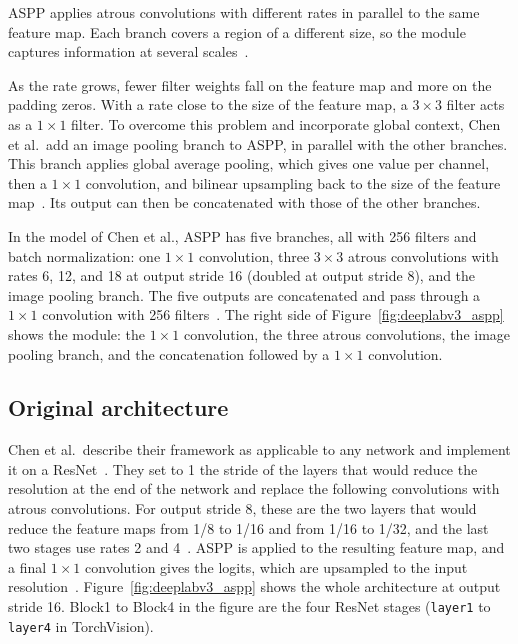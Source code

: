 ASPP applies atrous convolutions with different rates in parallel to the same feature map. Each branch covers a region of a different size, so the module captures information at several scales~\cite{chen2017deeplab}.

As the rate grows, fewer filter weights fall on the feature map and more on the padding zeros. With a rate close to the size of the feature map, a $3\times3$ filter acts as a $1\times1$ filter. To overcome this problem and incorporate global context, Chen et al.\ add an image pooling branch to ASPP, in parallel with the other branches. This branch applies global average pooling, which gives one value per channel, then a $1\times1$ convolution, and bilinear upsampling back to the size of the feature map~\cite{chen2017deeplab,geron2026handson}. Its output can then be concatenated with those of the other branches.

In the model of Chen et al., ASPP has five branches, all with 256 filters and batch normalization: one $1\times1$ convolution, three $3\times3$ atrous convolutions with rates 6, 12, and 18 at output stride 16 (doubled at output stride 8), and the image pooling branch. The five outputs are concatenated and pass through a $1\times1$ convolution with 256 filters~\cite{chen2017deeplab}. The right side of Figure~\ref{fig:deeplabv3_aspp} shows the module: the $1\times1$ convolution, the three atrous convolutions, the image pooling branch, and the concatenation followed by a $1\times1$ convolution.
\newpage
\subsection{Original architecture}
\label{subsec:deeplabv3_original}

Chen et al.\ describe their framework as applicable to any network and implement it on a ResNet~\cite{chen2017deeplab}. They set to 1 the stride of the layers that would reduce the resolution at the end of the network and replace the following convolutions with atrous convolutions. For output stride 8, these are the two layers that would reduce the feature maps from 1/8 to 1/16 and from 1/16 to 1/32, and the last two stages use rates 2 and 4~\cite{chen2017deeplab}. ASPP is applied to the resulting feature map, and a final $1\times1$ convolution gives the logits, which are upsampled to the input resolution~\cite{chen2017deeplab}. Figure~\ref{fig:deeplabv3_aspp} shows the whole architecture at output stride 16. Block1 to Block4 in the figure are the four ResNet stages (\texttt{layer1} to \texttt{layer4} in TorchVision).

